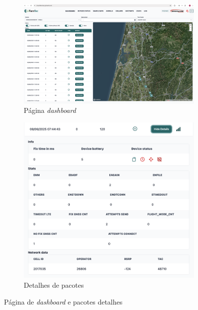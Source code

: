 \begin{figure}[!h]
	\centering
	\begin{subfigure}[c]{0.55\textwidth}
        \centering
        \includegraphics[width=\textwidth]{figs/dashboard.png}
        \caption{Página \textit{dashboard}}
        \label{fig:dashboard}
	\end{subfigure}
	\hfill
	\begin{subfigure}[c]{0.40\textwidth}
        \centering
        \includegraphics[width=\textwidth]{figs/dashboard-details.png}
        \caption{Detalhes de pacotes}
        \label{fig:packet-details}
	\end{subfigure}
	\caption{Página de \textit{dashboard} e pacotes detalhes}
    \label{fig:dashboard-page}
\end{figure}

